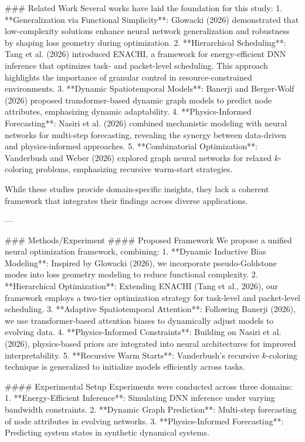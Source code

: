 ### Related Work  
Several works have laid the foundation for this study:  
1. **Generalization via Functional Simplicity**: Glowacki (2026) demonstrated that low-complexity solutions enhance neural network generalization and robustness by shaping loss geometry during optimization.  
2. **Hierarchical Scheduling**: Tang et al. (2026) introduced ENACHI, a framework for energy-efficient DNN inference that optimizes task- and packet-level scheduling. This approach highlights the importance of granular control in resource-constrained environments.  
3. **Dynamic Spatiotemporal Models**: Banerji and Berger-Wolf (2026) proposed transformer-based dynamic graph models to predict node attributes, emphasizing dynamic adaptability.  
4. **Physics-Informed Forecasting**: Nasiri et al. (2026) combined mechanistic modeling with neural networks for multi-step forecasting, revealing the synergy between data-driven and physics-informed approaches.  
5. **Combinatorial Optimization**: Vanderbush and Weber (2026) explored graph neural networks for relaxed $k$-coloring problems, emphasizing recursive warm-start strategies.  

While these studies provide domain-specific insights, they lack a coherent framework that integrates their findings across diverse applications.

---

### Methods/Experiment  
#### Proposed Framework  
We propose a unified neural optimization framework, combining:  
1. **Dynamic Inductive Bias Modeling**: Inspired by Glowacki (2026), we incorporate pseudo-Goldstone modes into loss geometry modeling to reduce functional complexity.  
2. **Hierarchical Optimization**: Extending ENACHI (Tang et al., 2026), our framework employs a two-tier optimization strategy for task-level and packet-level scheduling.  
3. **Adaptive Spatiotemporal Attention**: Following Banerji (2026), we use transformer-based attention biases to dynamically adjust models to evolving data.  
4. **Physics-Informed Constraints**: Building on Nasiri et al. (2026), physics-based priors are integrated into neural architectures for improved interpretability.  
5. **Recursive Warm Starts**: Vanderbush’s recursive $k$-coloring technique is generalized to initialize models efficiently across tasks.

#### Experimental Setup  
Experiments were conducted across three domains:  
1. **Energy-Efficient Inference**: Simulating DNN inference under varying bandwidth constraints.  
2. **Dynamic Graph Prediction**: Multi-step forecasting of node attributes in evolving networks.  
3. **Physics-Informed Forecasting**: Predicting system states in synthetic dynamical systems.  

